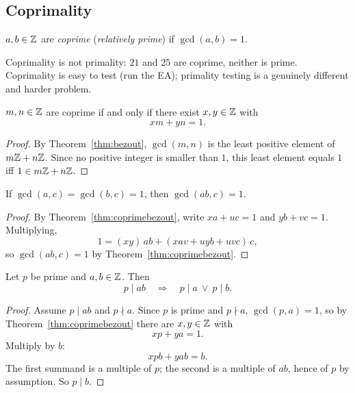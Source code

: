 \documentclass[11pt]{article}
\begin{document}
\subsection{Coprimality}
\label{sec:coprime}

\begin{definition}[Coprime]
$a,b\in\mathbb{Z}$ are \emph{coprime} (\emph{relatively prime}) if $\gcd(a,b)=1$.
\end{definition}

\begin{note}
Coprimality is not primality: $21$ and $25$ are coprime, neither is prime. Coprimality is easy to test (run the EA); primality testing is a genuinely different and harder problem.
\end{note}

\begin{theorem}
\label{thm:coprimebezout}
$m,n\in\mathbb{Z}$ are coprime if and only if there exist $x,y\in\mathbb{Z}$ with
\[
xm+yn=1.
\]
\end{theorem}

\begin{proof}
By Theorem~\ref{thm:bezout}, $\gcd(m,n)$ is the least positive element of $m\mathbb{Z}+n\mathbb{Z}$. Since no positive integer is smaller than $1$, this least element equals $1$ iff $1\in m\mathbb{Z}+n\mathbb{Z}$.
\end{proof}

\begin{lemma}\label{lem:coprimeprod}
If $\gcd(a,c)=\gcd(b,c)=1$, then $\gcd(ab,c)=1$.
\end{lemma}
\begin{proof}
By Theorem~\ref{thm:coprimebezout}, write $xa+uc=1$ and $yb+vc=1$. Multiplying,
\[
1=(xy)\,ab+(xav+uyb+uvc)\,c,
\]
so $\gcd(ab,c)=1$ by Theorem~\ref{thm:coprimebezout}.
\end{proof}

\begin{theorem}
\label{thm:euclidlemma}
Let $p$ be prime and $a,b\in\mathbb{Z}$. Then
\[
p\mid ab \quad\Longrightarrow\quad p\mid a \ \vee\ p\mid b.
\]
\end{theorem}

\begin{proof}
Assume $p\mid ab$ and $p\nmid a$. Since $p$ is prime and $p\nmid a$, $\gcd(p,a)=1$, so by Theorem~\ref{thm:coprimebezout} there are $x,y\in\mathbb{Z}$ with
\[
xp+ya=1.
\]
Multiply by $b$:
\[
xpb+yab=b.
\]
The first summand is a multiple of $p$; the second is a multiple of $ab$, hence of $p$ by assumption. So $p\mid b$.
\end{proof}
\end{document}
